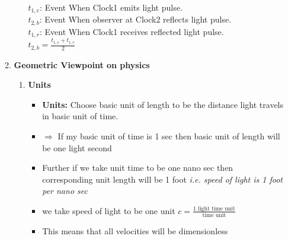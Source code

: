 \documentclass[11pt,a4paper]{article}
\begin{document}
\begin{enumerate}
\begin{enumerate}
\begin{enumerate}
                        $t_{1,e}$: Event When Clock1 emits light pulse.\\
                        $t_{2,b}$: Event When observer at Clock2 reflects light pulse.\\
                        $t_{1,r}$: Event When Clock1 receives reflected light pulse.\\
                        $t_{2,b}=\displaystyle{\frac{t_{1,e}+t_{1,r}}{2}}$\\
              \end{enumerate}
        \item \textbf{\Large Geometric Viewpoint on physics}
              \begin{enumerate}
                  \item \textbf{Units}
                        \begin{itemize}
                            \item \textbf{Units:} Choose basic unit of length to be the distance light travels in basic unit of time.
                            \item $\Rightarrow$ If my basic unit of time is 1 sec then basic unit of length will be one light second
                            \item Further if we take unit time to be one nano sec then corresponding unit length will be 1 foot \textit{i.e. speed of light is 1 foot per nano sec}
                            \item we take speed of light to be one unit $c=\displaystyle{\frac{\text{1 light time unit}}{\text{time unit}}}$
                            \item This means that all velocities will be dimensionless
                        \end{itemize}
                        \vspace{11pt}
                        \begin{center}
\end{center}
\end{enumerate}
\end{enumerate}
\end{enumerate}
\end{document}
